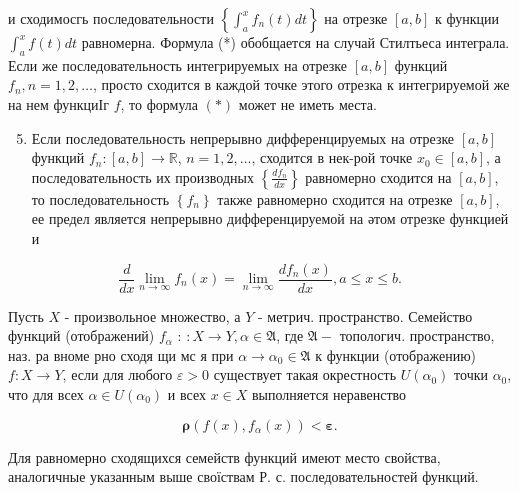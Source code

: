 \documentclass[10pt]{article}
\begin{document}
и сходимосгь последовательности $\left\{\int_{a}^{x} f_{n}(t) d t\right\}$ на отрезке $[a, b]$ к функции $\int_{a}^{x} f(t) d t$ равномерна. Формула (*) обобщается на случай Стилтьеса интеграла. Если же последовательность интегрируемых на отрезке $[a, b]$ функций $f_{n}, n=1,2, \ldots$, просто сходится в каждой точке этого отрезка к интегрируемой же на нем функциІг $f$, то формула $(*)$ может не иметь места.



\begin{enumerate}

  \setcounter{enumi}{4}

  \item Если последовательность непрерывно дифференцируемых на отрезке $[a, b]$ функций $f_{n}:[a, b] \rightarrow \mathbb{R}$, $n=1,2, \ldots$, сходится в нек-рой точке $x_{0} \in[a, b]$, а последовательность их производных $\left\{\frac{d f_{n}}{d x}\right\}$ равномерно сходится на $[a, b]$, то последовательность $\left\{f_{n}\right\}$ также равномерно сходится на отрезке $[a, b]$, ее предел является непрерывно дифференцируемой на әтом отрезке функцией и

\end{enumerate}



\[

\frac{d}{d x} \lim _{n \rightarrow \infty} f_{n}(x)=\lim _{n \rightarrow \infty} \frac{d f_{n}(x)}{d x}, a \leqslant x \leqslant b .

\]



Пусть $X$ - произвольное множество, а $Y$ - метрич. пространство. Семейство функций (отображений) $f_{\alpha}$ : $: X \rightarrow Y, \alpha \in \mathfrak{A}$, где $\mathfrak{A}-$ топологич. пространство, наз. ра вноме рно сходя щи мс я при $\alpha \rightarrow \alpha_{0} \in \mathfrak{A}$ к функции (отображению) $f: X \rightarrow Y$, если для любого $\varepsilon>0$ существует такая окрестность $U\left(\alpha_{0}\right)$ точки $\alpha_{0}$, что для всех $\alpha \in U\left(\alpha_{0}\right)$ и всех $x \in X$ выполняется неравенство



\[

\boldsymbol{\rho}\left(f(x), f_{\alpha}(x)\right)<\boldsymbol{\varepsilon} .

\]



Для равномерно сходящихся семейств функций имеют место свойства, аналогичные указанным выше своїствам Р. с. последовательностей функций.
\end{document}

